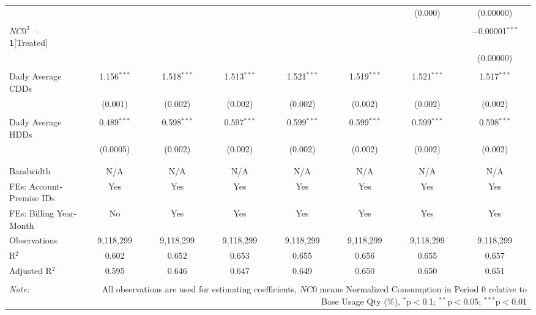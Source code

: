 \begin{table}[!htbp]
\begin{adjustbox}{scale = 0.65}
\begin{tabular}{@{\extracolsep{50pt}}lccccccc}
  &  &  &  &  &  & (0.000) & (0.00000) \\ 
  & & & & & & & \\ 
 $NC0^{3}$ $\ \cdot \ $ \textbf{1}[Treated] &  &  &  &  &  &  & $-$0.00001$^{***}$ \\ 
  &  &  &  &  &  &  & (0.00000) \\ 
  & & & & & & & \\ 
 Daily Average CDDs & 1.156$^{***}$ & 1.518$^{***}$ & 1.513$^{***}$ & 1.521$^{***}$ & 1.519$^{***}$ & 1.521$^{***}$ & 1.517$^{***}$ \\ 
  & (0.001) & (0.002) & (0.002) & (0.002) & (0.002) & (0.002) & (0.002) \\ 
  & & & & & & & \\ 
 Daily Average HDDs & 0.489$^{***}$ & 0.598$^{***}$ & 0.597$^{***}$ & 0.599$^{***}$ & 0.599$^{***}$ & 0.599$^{***}$ & 0.598$^{***}$ \\ 
  & (0.0005) & (0.002) & (0.002) & (0.002) & (0.002) & (0.002) & (0.002) \\ 
  & & & & & & & \\ 
\hline \\[-1.8ex] 
Bandwidth & N/A & N/A & N/A & N/A & N/A & N/A & N/A \\ 
FEs: Account-Premise IDs & Yes & Yes & Yes & Yes & Yes & Yes & Yes \\ 
FEs: Billing Year-Month & No & Yes & Yes & Yes & Yes & Yes & Yes \\ 
Observations & 9,118,299 & 9,118,299 & 9,118,299 & 9,118,299 & 9,118,299 & 9,118,299 & 9,118,299 \\ 
R$^{2}$ & 0.602 & 0.652 & 0.653 & 0.655 & 0.656 & 0.655 & 0.657 \\ 
Adjusted R$^{2}$ & 0.595 & 0.646 & 0.647 & 0.649 & 0.650 & 0.650 & 0.651 \\ 
\hline 
\hline \\[-1.8ex] 
\textit{Note:}  & \multicolumn{7}{r}{All observations are used for estimating coefficients, $NC0$ means Normalized Consumption in Period 0 relative to Base Usage Qty (\%), $^{*}$p$<$0.1; $^{**}$p$<$0.05; $^{***}$p$<$0.01} \\ 
\end{tabular}
\end{adjustbox}
\end{table} 
